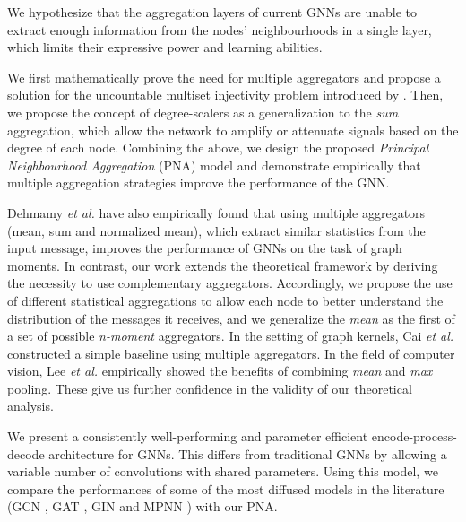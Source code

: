 \documentclass{article}
\begin{document}
We hypothesize that the aggregation layers of current GNNs are unable to extract enough information from the nodes' neighbourhoods in a single layer, which limits their expressive power and learning abilities. 

We first mathematically prove the need for multiple aggregators and propose a solution for the uncountable multiset injectivity problem introduced by \cite{xu2018gin}. Then, we propose the concept of degree-scalers as a generalization to the \textit{sum} aggregation, which allow the network to amplify or attenuate signals based on the degree of each node. Combining the above, we design the proposed \emph{Principal Neighbourhood Aggregation} (PNA) model and demonstrate empirically that multiple aggregation strategies improve the performance of the GNN.

Dehmamy \emph{et al.} \cite{dehmamy2019understanding} have also empirically found that using multiple aggregators (mean, sum and normalized mean), which extract similar statistics from the input message, improves the performance of GNNs on the task of graph moments. In contrast, our work extends the theoretical framework by deriving the necessity to use complementary aggregators. Accordingly, we propose the use of different statistical aggregations to allow each node to better understand the distribution of the messages it receives, and we generalize the \textit{mean} as the first of a set of possible \textit{n-moment} aggregators. In the setting of graph kernels, Cai \textit{et al.} \cite{cai2018simple} constructed a simple baseline using multiple aggregators. In the field of computer vision, Lee \textit{et al.} \cite{lee2016generalizing} empirically showed the benefits of combining \textit{mean} and \textit{max} pooling. These give us further confidence in the validity of our theoretical analysis.

We present a consistently well-performing and parameter efficient encode-process-decode architecture \cite{hamrick2018relational} for GNNs. This differs from traditional GNNs by allowing a variable number of convolutions with shared parameters. Using this model, we compare the performances of some of the most diffused models in the literature (GCN \cite{kipf2016gcn}, GAT \cite{velikovic2017gat}, GIN \cite{xu2018gin} and MPNN \cite{gilmer2017mpnn}) with our PNA.
\end{document}
